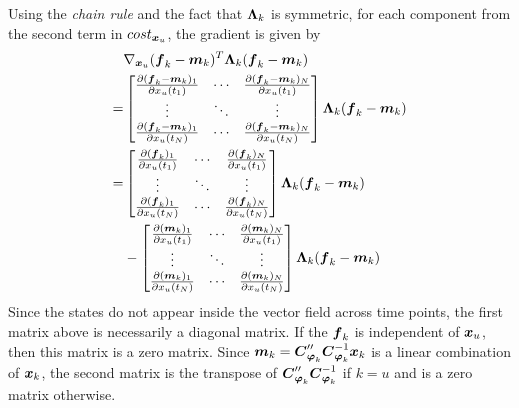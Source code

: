 Using the \emph{chain rule} and the fact that $\boldsymbol{\Lambda}_{k}$ is symmetric, for each component from the second term in $cost_{\boldsymbol{x}_{u}}$, the gradient is given by
\begin{align}
    &\nabla_{\boldsymbol{x}_{u}}(\boldsymbol{f}_{k}-\boldsymbol{m}_{k})^T\boldsymbol{\Lambda}_{k}(\boldsymbol{f}_{k}-\boldsymbol{m}_{k})
    \nonumber
    \\
    = & 
    \begin{bmatrix}
        \frac{\partial(\boldsymbol{f}_{k}-\boldsymbol{m}_{k})_1}{\partial x_{u}(t_{1})} 
        & 
        \cdots 
        & 
        \frac{\partial(\boldsymbol{f}_{k}-\boldsymbol{m}_{k})_N}{\partial x_{u}(t_{1})}
        \\
        \vdots 
        &
        \ddots
        &
        \vdots
        \\
        \frac{\partial(\boldsymbol{f}_{k}-\boldsymbol{m}_{k})_1}{\partial x_{u}(t_{N})} 
        &
        \cdots
        &
        \frac{\partial(\boldsymbol{f}_{k}-\boldsymbol{m}_{k})_N}{\partial x_{u}(t_{N})} 
    \end{bmatrix}
    \boldsymbol{\Lambda}_{k}
    (\boldsymbol{f}_{k}-\boldsymbol{m}_{k})
    \nonumber
    \\
    = &
    \begin{bmatrix}
        \frac{\partial(\boldsymbol{f}_{k})_1}{\partial x_{u}(t_{1})} 
        & 
        \cdots 
        & 
        \frac{\partial(\boldsymbol{f}_{k})_N}{\partial x_{u}(t_{1})}
        \\
        \vdots 
        &
        \ddots
        &
        \vdots
        \\
        \frac{\partial(\boldsymbol{f}_{k})_1}{\partial x_{u}(t_{N})} 
        &
        \cdots
        &
        \frac{\partial(\boldsymbol{f}_{k})_N}{\partial x_{u}(t_{N})} 
    \end{bmatrix}
    \boldsymbol{\Lambda}_{k}(\boldsymbol{f}_{k}-\boldsymbol{m}_{k}) 
    \nonumber
    \\
    & -
    \begin{bmatrix}
        \frac{\partial(\boldsymbol{m}_{k})_1}{\partial x_{u}(t_{1})} 
        & 
        \cdots 
        & 
        \frac{\partial(\boldsymbol{m}_{k})_N}{\partial x_{u}(t_{1})}
        \\
        \vdots 
        &
        \ddots
        &
        \vdots
        \\
        \frac{\partial(\boldsymbol{m}_{k})_1}{\partial x_{u}(t_{N})} 
        &
        \cdots
        &
        \frac{\partial(\boldsymbol{m}_{k})_N}{\partial x_{u}(t_{N})} 
    \end{bmatrix}
    \boldsymbol{\Lambda}_{k}(\boldsymbol{f}_{k}-\boldsymbol{m}_{k})  
\end{align}
Since the states do not appear inside the vector field across time points, the first matrix above is necessarily a diagonal matrix.
If the $\boldsymbol{f}_{k}$ is independent of $\boldsymbol{x}_{u}$, then this matrix is a zero matrix.
Since $\boldsymbol{m}_{k} = \boldsymbol{C}^{\prime\prime}_{\boldsymbol{\varphi}_{k}}\boldsymbol{C}_{\boldsymbol{\varphi}_{k}}^{-1}\boldsymbol{x}_{k}$ is a linear combination of $\boldsymbol{x}_{k}$, the second matrix is the transpose of $\boldsymbol{C}^{\prime\prime}_{\boldsymbol{\varphi}_{k}}\boldsymbol{C}_{\boldsymbol{\varphi}_{k}}^{-1}$ if $k = u$ and is a zero matrix otherwise.

